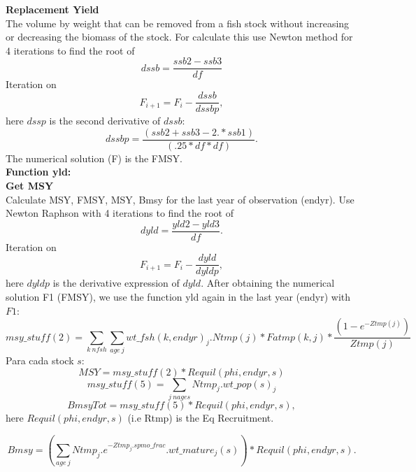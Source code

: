 \documentclass{article}
\begin{document}
\textbf{Replacement Yield}\\
The volume by weight that can be removed from a fish stock without increasing or decreasing the biomass of the stock.
For calculate this use Newton method for 4 iterations to find the root of 
\begin{equation}
    dssb   = \dfrac{ssb2 - ssb3}{df}
\end{equation}
Iteration on
\begin{equation}
    F_{i+1}=F_{i}-\dfrac{dssb}{dssbp},
\end{equation}
here $dssp$ is the second derivative of $dssb$:
\begin{equation}
    dssbp  = \dfrac{(ssb2 + ssb3 - 2.*ssb1)}{(.25*df*df)}.
\end{equation}
The numerical solution (F) is the  FMSY.\\
\textbf{Function yld:}\\
\textbf{Get MSY}\\

Calculate MSY, FMSY, MSY, Bmsy for the last year of observation (endyr). 
Use Newton Raphson with 4 iterations to find the root of
\begin{equation}
        dyld=\dfrac{yld2-yld3}{df}.
    \end{equation}
Iteration on
\begin{equation}
    F_{i+1}=F_i-\dfrac{dyld}{dyldp},
\end{equation}
    here $dyldp$ is the derivative expression of $dyld$. 
After obtaining the numerical solution F1 (FMSY), we use the function yld again in the last year (endyr) with $F1$:
\begin{equation}
msy\_stuff(2) = \sum_{k \ nfsh}\sum_{age \ j}wt\_fsh(k,endyr)_j.Ntmp(j)*Fatmp(k,j)*\dfrac{(1-e^{-Ztmp(j)})}{Ztmp(j)}
\end{equation}
Para cada stock $s$:
\begin{equation}
    MSY=msy\_stuff(2)*Requil(phi,endyr,s)
\end{equation}
\begin{equation}
    msy\_stuff(5)=\sum_{j \ nages}Ntmp_j.wt\_pop(s)_j
\end{equation}
\begin{equation}
    BmsyTot=msy\_stuff(5)*Requil(phi,endyr,s),
\end{equation}
here $Requil(phi,endyr,s)$ (i.e Rtmp) is the Eq Recruitment.

\begin{equation}
    Bmsy=\left(\sum_{age \ j}Ntmp_j.e^{-Ztmp_j.spmo\_frac}.wt\_mature_j(s)\right)*Requil(phi,endyr,s).
\end{equation}
\end{document}
